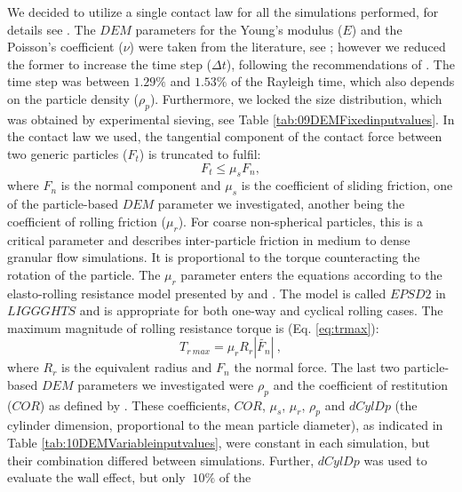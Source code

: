 \documentclass{CFD2015}
\begin{document}
We decided to utilize a single
contact law for all the simulations performed, for details see
\citet{RefWorks:180}.
The $DEM$ parameters for the Young's modulus ($E$) and the Poisson's coefficient
($\nu$) were taken from the literature, see \citet{RefWorks:175}; 
however we reduced the former to increase the time step
($\Delta t$), following the recommendations of \citet{RefWorks:131}.
The time step was between $1.29 \%$ and $1.53 \%$ of the Rayleigh time, which
also depends on the particle density ($\rho_p$).
Furthermore, we locked the size distribution, which was obtained by experimental
sieving, see Table \ref{tab:09DEMFixedinputvalues}.
In the contact law we used, 
the tangential component of the contact force between two generic particles
($F_t$) is truncated to fulfil:
\begin{equation}
F_{t} \leq \mu_s F_{n},
 \label{eq:force_t}
\end{equation}
where $F_n$ is the normal component and $\mu_s$ is the coefficient of sliding
friction, one of the particle-based $DEM$ parameter we investigated, 
another being the coefficient of rolling friction ($\mu_r$). 
For coarse non-spherical particles, this is a critical parameter and describes
inter-particle friction in medium to dense granular flow simulations. It is proportional to the 
torque counteracting the rotation of the particle. The $\mu_r$ parameter enters the 
equations according to the elasto-rolling resistance model presented by
\citet{RefWorks:87} and \citet{RefWorks:131}. 
The model is called $EPSD2$ in $LIGGGHTS$ and is appropriate for both one-way and cyclical rolling cases.
The maximum magnitude of rolling resistance torque is (Eq. \ref{eq:trmax}):
\begin{equation}
T_{r~max} = \mu_r R_r |\tilde{F_n}| ~,
 \label{eq:trmax}
\end{equation}
where $R_r$ is the equivalent radius and $F_n$ the normal force.
The last two particle-based $DEM$ parameters we investigated were $\rho_p$
and the coefficient of restitution ($COR$) as defined by \citet{RefWorks:131}.
These coefficients, $COR$, $\mu_s$, $\mu_r$,
$\rho_p$ and $dCylDp$ (the cylinder dimension, proportional to the mean
particle diameter), as indicated in Table \ref{tab:10DEMVariableinputvalues}, 
were constant in each simulation, but their combination differed between
simulations.
Further, $dCylDp$ was used to evaluate the wall effect, but only $~10\%$ of the
\end{document}
